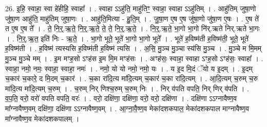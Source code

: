 \documentclass[17pt]{extarticle}
\begin{document}
26. इ॒हि॒ स्वाहा॒ स्वा हे॑हीहि॒ स्वाहा᳚ । . स्वाहा ऽऽहु॑ति॒ माहु॑तिꣳ॒॒ स्वाहा॒ स्वाहा ऽऽहु॑तिम् । . आहु॑तिम् जुषा॒णो जु॑षा॒ण आहु॑ति॒ माहु॑तिम् जुषा॒णः । . आहु॑ति॒मित्या - हु॒ति॒म् । . जु॒षा॒ण ए॒ष ए॒ष जु॑षा॒णो जु॑षा॒ण ए॒षः । . ए॒ष ते॑ त ए॒ष ए॒ष ते᳚ । . ते॒ नि॒र्॒.ऋ॒ते॒ नि॒र्॒.ऋ॒ते॒ ते॒ ते॒ नि॒र्॒.ऋ॒ते॒ । . नि॒र्॒.ऋ॒ते॒ भा॒गो भा॒गो नि॑र्.ऋते निर्.ऋते भा॒गः । . नि॒र्॒.ऋ॒त॒ इति॑ निः - ऋ॒ते॒ । . भा॒गो भूते॒ भूते॑ भा॒गो भा॒गो भूते᳚ । . भूते॑ ह॒विष्म॑ती ह॒विष्म॑ती॒ भूते॒ भूते॑ ह॒विष्म॑ती । . ह॒विष्म॑ त्यस्यसि ह॒विष्म॑ती ह॒विष्म॑ त्यसि । . अ॒सि॒ मु॒ञ्च मु॒ञ्चा स्य॑सि मु॒ञ्च । . मु॒ञ्चे म मि॒मम् मु॒ञ्च मु॒ञ्चे मम् । . इ॒म मꣳह॒सो ऽꣳह॑स इ॒म मि॒म मꣳह॑सः । . अꣳह॑सः॒ स्वाहा॒ स्वाहा ऽꣳह॒सो ऽꣳह॑सः॒ स्वाहा᳚ । . स्वाहा॒ नमो॒ नमः॒ स्वाहा॒ स्वाहा॒ नमः॑ । . नमो॒ यो यो नमो॒ नमो॒ यः । . य इ॒द मि॒दं ॅयो य इ॒दम् । . इ॒दम् च॒कार॑ च॒कारे॒ द मि॒दम् च॒कार॑ । . च॒का रा॑दि॒त्य मा॑दि॒त्यम् च॒कार॑ च॒का रा॑दि॒त्यम् । . आ॒दि॒त्यम् च॒रुम् च॒रु मा॑दि॒त्य मा॑दि॒त्यम् च॒रुम् । . च॒रुम् निर् णिश्च॒रुम् च॒रुम् निः । . निर् व॑पति वपति॒ निर् णिर् व॑पति । . व॒प॒ति॒ वरो॒ वरो॑ वपति वपति॒ वरः॑ । . वरो॒ दक्षि॑णा॒ दक्षि॑णा॒ वरो॒ वरो॒ दक्षि॑णा । . दक्षि॑णा ऽऽग्नावैष्ण॒व मा᳚ग्नावैष्ण॒वम् दक्षि॑णा॒ दक्षि॑णा ऽऽग्नावैष्ण॒वम् । . आ॒ग्ना॒वै॒ष्ण॒व मेका॑दशकपाल॒ मेका॑दशकपाल माग्नावैष्ण॒व मा᳚ग्नावैष्ण॒व मेका॑दशकपालम् । \newline
\end{document}
